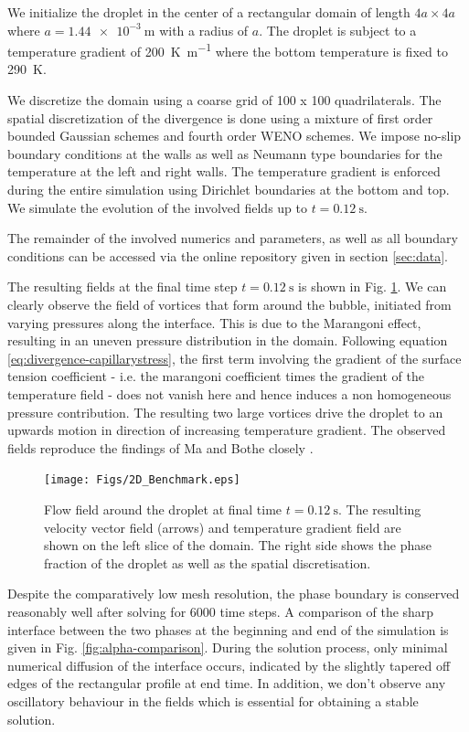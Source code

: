 \documentclass[conference,final,a4paper]{IEEEtran}
\begin{document}
We initialize the droplet in the center of a rectangular domain of length $4a \times 4a$ where $a = \SI{1.44e-3}{\metre}$ with a radius of $a$. The droplet is subject to a temperature gradient of \SI{200}{\kelvin \per \metre} where the bottom temperature is fixed to \SI{290}{\kelvin}.

We discretize the domain using a coarse grid of 100 x 100 quadrilaterals. The spatial discretization of the divergence is done using a mixture of first order bounded Gaussian schemes and fourth order WENO schemes.
We impose no-slip boundary conditions at the walls as well as Neumann type boundaries for the temperature at the left and right walls. The temperature gradient is enforced during the entire simulation using Dirichlet boundaries at the bottom and top. We simulate the evolution of the involved fields up to $t = \SI{0.12}{\second}$.

The remainder of the involved numerics and parameters, as well as all boundary conditions can be accessed via the online repository given in section \ref{sec:data}.

The resulting fields at the final time step $t = \SI{0.12}{\second}$ is shown in Fig. \ref{fig:2d-benchmark}. We can clearly observe the field of vortices that form around the bubble, initiated from varying pressures along the interface. This is due to the Marangoni effect, resulting in an uneven pressure distribution in the domain. Following equation \ref{eq:divergence-capillarystress}, the first term involving the gradient of the surface tension coefficient - i.e. the marangoni coefficient times the gradient of the temperature field - does not vanish here and hence induces a non homogeneous pressure contribution. The resulting two large vortices drive the droplet to an upwards motion in direction of increasing temperature gradient. The observed fields reproduce the findings of Ma and Bothe closely \cite{maDirectNumericalSimulation2011}.

\begin{figure}[!tbp]
  \centering
  \texttt{[image: Figs/2D\_Benchmark.eps]}
  \caption{Flow field around the droplet at final time $t = \SI{0.12}{\second}$. The resulting velocity vector field (arrows) and temperature gradient field are shown on the left slice of the domain. The right side shows the phase fraction of the droplet as well as the spatial discretisation.}
  \label{fig:2d-benchmark}
\end{figure}

Despite the comparatively low mesh resolution, the phase boundary is conserved reasonably well after solving for 6000 time steps. A comparison of the sharp interface between the two phases at the beginning and end of the simulation is given in Fig. \ref{fig:alpha-comparison}. During the solution process, only minimal numerical diffusion of the interface occurs, indicated by the slightly tapered off edges of the rectangular profile at end time. In addition, we don't observe any oscillatory behaviour in the fields which is essential for obtaining a stable solution.
\end{document}
